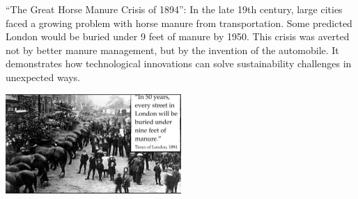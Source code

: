 \documentclass[
  ignorenonframetext,
]{beamer}
\begin{document}
\begin{frame}{``The Great Horse Manure Crisis of 1894'':}
\label{the-great-horse-manure-crisis-of-1894}
In the late 19th century, large cities faced a growing problem with
horse manure from transportation. Some predicted London would be buried
under 9 feet of manure by 1950. This crisis was averted not by better
manure management, but by the invention of the automobile. It
demonstrates how technological innovations can solve sustainability
challenges in unexpected ways.

\includegraphics[width=0.5\textwidth,height=\textheight]{L2_files/mediabag/f22368cb-6608-4310-9.jpg}
\end{frame}
\end{document}
